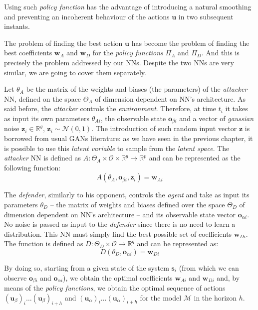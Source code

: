 Using such \textit{policy function} has the advantage of introducing a natural smoothing and preventing an incoherent behaviour of the actions $\textbf{u}$ in two subsequent instants.

The problem of finding the best action $\textbf{u}$ has become the problem of finding the best coefficients $\textbf{w}_A$ and $\textbf{w}_D$ for the \textit{policy functions} $\Pi_A$ and $\Pi_D$.
And this is precisely the problem addressed by our NNs.
Despite the two NNs are very similar, we are going to cover them separately.

Let $\theta_A$ be the matrix of the weights and biases (the parameters) of the \textit{attacker} NN, defined on the space $\Theta_A$ of dimension dependent on NN's architecture.
As said before, the \textit{attacker} controls the \textit{environment}.
Therefore, at time $t_i$ it takes as input its own parameters $\theta_{Ai}$, the observable state $\textbf{o}_{\beta i}$ and a vector of \textit{gaussian} noise $\mathbf{z}_i \in \mathbb{R}^g$,  $\mathbf{z}_i  \sim \mathcal{N}(0, 1)$.
The introduction of such random input vector $\textbf{z}$ is borrowed from usual GANs literature: as we have seen in the previous chapter, it is possible to use this \textit{latent variable} to sample from the \textit{latent space}. 
The \textit{attacker} NN is defined as $A: \Theta_A \times \mathcal{O} \times \mathbb{R}^g \to \mathbb{R}^p$ and can be represented as the following function:
$$ A(\theta_A, \textbf{o}_{\beta i}, \textbf{z}_i) = \textbf{w}_{Ai}$$

The \textit{defender}, similarly to his opponent, controls the \textit{agent} and take as input its parameters $\theta_D$ -- the matrix of weights and biases defined over the space $\Theta_D$ of dimension dependent on NN's architecture -- and its observable state vector $\textbf{o}_{\alpha i}$.
No noise is passed as input to the \textit{defender} since there is no need to learn a distribution.
This NN must simply find the best possible set of coefficients $\textbf{w}_{Di}$.
The function is defined as $D: \Theta_D \times \mathcal{O} \to \mathbb{R}^q$ and can be represented as:
$$ D(\theta_D, \textbf{o}_{\alpha i}) =  \textbf{w}_{Di} $$

By doing so, starting from a given state of the system $\textbf{s}_i$ (from which we can observe $\textbf{o}_{\beta i}$ and $\textbf{o}_{\alpha i}$), we obtain the optimal coefficients $\textbf{w}_{Ai}$ and $\textbf{w}_{Di}$ and, by means of the \textit{policy functions}, we obtain the optimal sequence of actions $(\textbf{u}_\beta)_i \dots (\textbf{u}_\beta)_{i+h}$ and $(\textbf{u}_\alpha)_i \dots (\textbf{u}_\alpha)_{i+h}$ for the model $\mathcal{M}$ in the horizon $h$.

